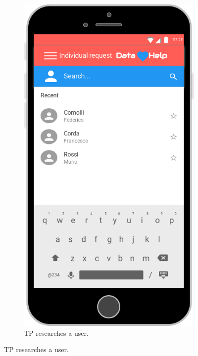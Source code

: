 \begin{figure}[ht]
  \centering
  \begin{subfigure}[t]{0.38\linewidth}
    \addtocounter{subfigure}{2}
    \includegraphics[width=\linewidth]{images/Mock-up/Individual_Request_1.png}
    \caption{TP researches a user.}
  \end{subfigure} \hfil \hfil \hfil

\end{figure}

